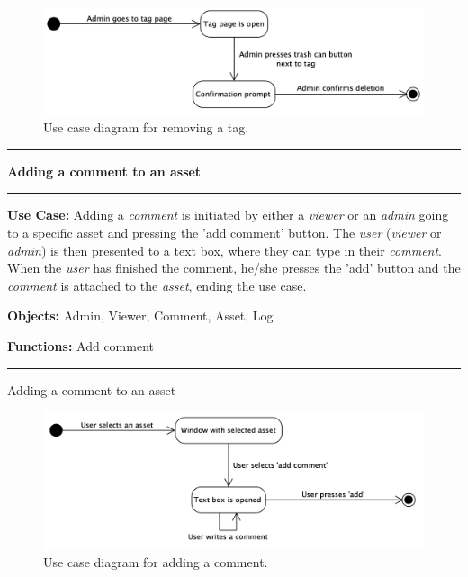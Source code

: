 \begin{figure}[H]
    \centering
    \includegraphics[width=1.0\textwidth]{figures/RemoveTag.png}
    \caption{Use case diagram for removing a tag.}
    \label{fig:UseCaseRemoveTag}
\end{figure}


\begin{use_case}[H]
    \hrule
    \vskip 0.3cm
    \Large
    \begin{center}
    
        \textbf{Adding a comment to an asset}
        
    \end{center}
    \vskip 0.1cm
    \hrule
    \vskip 0.2cm
    \normalsize
    
    \textbf{Use Case:} Adding a \textit{comment} is initiated by either a \textit{viewer} or an \textit{admin} going to a specific asset and pressing the 'add comment' button. The \textit{user} (\textit{viewer} or \textit{admin}) is then presented to a text box, where they can type in their \textit{comment}. When the \textit{user} has finished the comment, he/she presses the 'add' button and the \textit{comment} is attached to the \textit{asset}, ending the use case.
    
    \vskip 0.2cm
    
    \textbf{Objects:} Admin, Viewer, Comment, Asset, Log
    
    \vskip 0.2cm
    
    \textbf{Functions:} Add comment
    
    \vskip 0.4cm
    \hrule
    \vskip 0.2cm
    \caption{Adding a comment to an asset} \label{use_case:adding_a_comment_to_an_asset}
\end{use_case}

\begin{figure}[H]
    \centering
    \includegraphics[width=1.0\textwidth]{figures/AddComment.png}
    \caption{Use case diagram for adding a comment.}
    \label{fig:UseCaseAddComment}
\end{figure}


